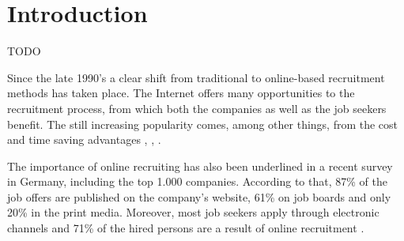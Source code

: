 
%
%

\chapter{Introduction}

TODO

Since the late 1990's a clear shift from traditional to online-based recruitment methods has taken place. The Internet offers many opportunities to the recruitment process, from which both the companies as well as the job seekers benefit. The still increasing popularity comes, among other things, from the cost and time saving advantages \cite{hada04}, \cite{leeI07}, \cite{mung02}.

The importance of online recruiting has also been underlined in a recent survey in Germany, including the top 1.000 companies. According to that, 87\% of the job offers are published on the company's website, 61\% on job boards and only 20\% in the print media. Moreover, most job seekers apply through electronic channels and 71\% of the hired persons are a result of online recruitment \cite{weit11}.

